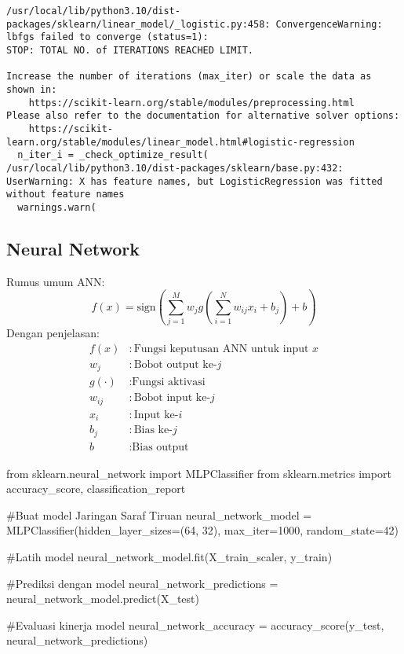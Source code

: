 \documentclass[
  letterpaper,
]{krantz}
\makeatletter
\newenvironment{Shaded}{\begin{snugshade}}{\end{snugshade}}
\newcommand{\CommentTok}[1]{\textcolor[rgb]{0.37,0.37,0.37}{#1}}
\newcommand{\DecValTok}[1]{\textcolor[rgb]{0.68,0.00,0.00}{#1}}
\newcommand{\ImportTok}[1]{\textcolor[rgb]{0.00,0.46,0.62}{#1}}
\newcommand{\NormalTok}[1]{\textcolor[rgb]{0.00,0.23,0.31}{#1}}
\newcommand{\OperatorTok}[1]{\textcolor[rgb]{0.37,0.37,0.37}{#1}}
\newenvironment{kframe}{%
\medskip{}
\setlength{\fboxsep}{.8em}
 \def\at@end@of@kframe{}%
 \ifinner\ifhmode%
  \def\at@end@of@kframe{\end{minipage}}%
  \begin{minipage}{\columnwidth}%
 \fi\fi%
 \def\FrameCommand##1{\hskip\@totalleftmargin \hskip-\fboxsep
 \colorbox{shadecolor}{##1}\hskip-\fboxsep
     \hskip-\linewidth \hskip-\@totalleftmargin \hskip\columnwidth}%
 \MakeFramed {\advance\hsize-\width
   \@totalleftmargin\z@ \linewidth\hsize
   \@setminipage}}%
 {\par\unskip\endMakeFramed%
 \at@end@of@kframe}
\renewenvironment{Shaded}{\begin{kframe}}{\end{kframe}}
\makeatother
\begin{document}
\begin{verbatim}
/usr/local/lib/python3.10/dist-packages/sklearn/linear_model/_logistic.py:458: ConvergenceWarning: lbfgs failed to converge (status=1):
STOP: TOTAL NO. of ITERATIONS REACHED LIMIT.

Increase the number of iterations (max_iter) or scale the data as shown in:
    https://scikit-learn.org/stable/modules/preprocessing.html
Please also refer to the documentation for alternative solver options:
    https://scikit-learn.org/stable/modules/linear_model.html#logistic-regression
  n_iter_i = _check_optimize_result(
/usr/local/lib/python3.10/dist-packages/sklearn/base.py:432: UserWarning: X has feature names, but LogisticRegression was fitted without feature names
  warnings.warn(
\end{verbatim}

\hypertarget{neural-network}{%
\subsection{Neural Network}\label{neural-network}}

Rumus umum ANN: \[
f(x) = \text{sign}\left(\sum_{j=1}^{M} w_j g\left(\sum_{i=1}^{N} w_{ij} x_i + b_j\right) + b\right)
\] Dengan penjelasan: \[
\begin{align*}
f(x) & : \text{Fungsi keputusan ANN untuk input } x \\
w_j & : \text{Bobot output ke-} j \\
g(\cdot) & : \text{Fungsi aktivasi} \\
w_{ij} & : \text{Bobot input ke-} j \\
x_i & : \text{Input ke-} i \\
b_j & : \text{Bias ke-} j \\
b & : \text{Bias output}
\end{align*}
\]

\begin{Shaded}
\begin{Highlighting}[]
\ImportTok{from}\NormalTok{ sklearn.neural\_network }\ImportTok{import}\NormalTok{ MLPClassifier}
\ImportTok{from}\NormalTok{ sklearn.metrics }\ImportTok{import}\NormalTok{ accuracy\_score, classification\_report}

\CommentTok{\#Buat model Jaringan Saraf Tiruan}
\NormalTok{neural\_network\_model }\OperatorTok{=}\NormalTok{ MLPClassifier(hidden\_layer\_sizes}\OperatorTok{=}\NormalTok{(}\DecValTok{64}\NormalTok{, }\DecValTok{32}\NormalTok{), max\_iter}\OperatorTok{=}\DecValTok{1000}\NormalTok{, random\_state}\OperatorTok{=}\DecValTok{42}\NormalTok{)}

\CommentTok{\#Latih model}
\NormalTok{neural\_network\_model.fit(X\_train\_scaler, y\_train)}

\CommentTok{\#Prediksi dengan model}
\NormalTok{neural\_network\_predictions }\OperatorTok{=}\NormalTok{ neural\_network\_model.predict(X\_test)}

\CommentTok{\#Evaluasi kinerja model}
\NormalTok{neural\_network\_accuracy }\OperatorTok{=}\NormalTok{ accuracy\_score(y\_test, neural\_network\_predictions)}
\end{Highlighting}
\end{Shaded}
\end{document}
